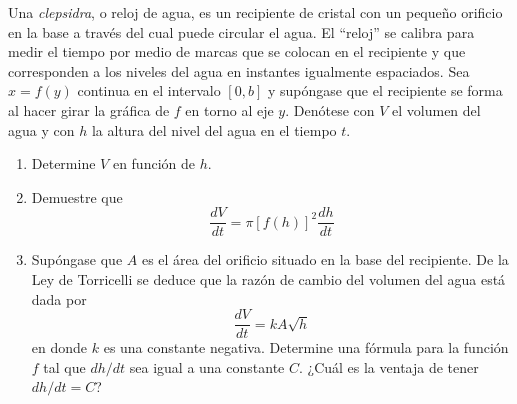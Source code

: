 \item Una \textit{clepsidra}, o reloj de agua, es un recipiente de cristal con un pequeño orificio en la base a través del cual puede circular el agua. El ``reloj'' se calibra para medir el tiempo por medio de marcas que se colocan en el recipiente y que corresponden a los niveles del agua en instantes igualmente espaciados. Sea $x = f(y)$ continua en el intervalo $[0, b]$ y supóngase que el recipiente se forma al hacer girar la gráfica de $f$ en torno al eje $y$. Denótese con $V$ el volumen del agua y con $h$ la altura del nivel del agua en el tiempo $t$.
\begin{enumerate}
    \item[(a)] Determine $V$ en función de $h$.
    \item[(b)] Demuestre que
    $$\frac{dV}{dt} = \pi [f(h)]^2 \frac{dh}{dt}$$
    \item[(c)] Supóngase que $A$ es el área del orificio situado en la base del recipiente. De la Ley de Torricelli se deduce que la razón de cambio del volumen del agua está dada por
    $$\frac{dV}{dt} = kA\sqrt{h}$$
    en donde $k$ es una constante negativa. Determine una fórmula para la función $f$ tal que $dh/dt$ sea igual a una constante $C$. ¿Cuál es la ventaja de tener $dh/dt = C$?
\end{enumerate}
\begin{center}
\end{center}
